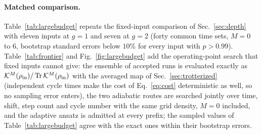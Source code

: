 \documentclass[
  aps,            %
  prc,            %
  reprint,        %
  superscriptaddress,
  floatfix,
  nofootinbib
]{revtex4-2}
\begin{document}
\paragraph{Matched comparison.}
Table~\ref{tab:largebudget} repeats the fixed-input comparison of
Sec.~\ref{sec:depth} with eleven inputs at $g=1$ and seven at $g=2$ (forty
common time sets, $M=0$ to $6$, bootstrap standard errors below $10\%$ for
every input with $p>0.99$).  Table~\ref{tab:frontier} and
Fig.~\ref{fig:largebudget} add the operating-point search that fixed inputs
cannot give: the ensemble of accepted runs is evaluated exactly as
$\mathcal K^M(\rho_{\rm in})/\Tr\mathcal K^M(\rho_{\rm in})$ with the
averaged map of Sec.~\ref{sec:trotterized} (independent cycle times make
the cost of Eq.~\eqref{eq:cost} deterministic as well, so no sampling error
enters), the two adiabatic routes are searched jointly over time, shift,
step count and cycle number with the same grid density, $M=0$ included, and
the adaptive ansatz is admitted at every prefix; the sampled values of
Table~\ref{tab:largebudget} agree with the exact ones within their
bootstrap errors.
\end{document}
